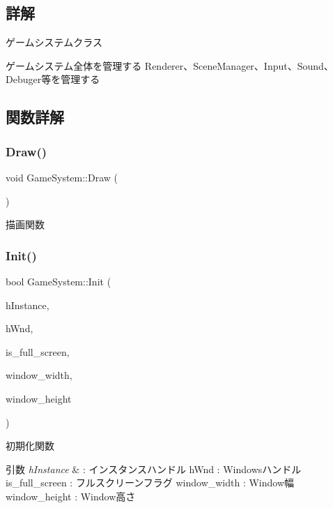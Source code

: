 \subsection{詳解}
ゲームシステムクラス 

ゲームシステム全体を管理する Renderer、\+Scene\+Manager、\+Input、\+Sound、\+Debuger等を管理する 

\subsection{関数詳解}
\mbox{\label{class_game_system_a474db0066b23d39e94e0a830140edce5}} 
\subsubsection{\texorpdfstring{Draw()}{Draw()}}
{\footnotesize\ttfamily void Game\+System\+::\+Draw (\begin{DoxyParamCaption}{ }\end{DoxyParamCaption})}



描画関数 

\mbox{\label{class_game_system_ad4c08500b98490e00ce87a770bb5e981}} 
\subsubsection{\texorpdfstring{Init()}{Init()}}
{\footnotesize\ttfamily bool Game\+System\+::\+Init (\begin{DoxyParamCaption}\item[{H\+I\+N\+S\+T\+A\+N\+CE}]{h\+Instance,  }\item[{H\+W\+ND}]{h\+Wnd,  }\item[{B\+O\+OL}]{is\+\_\+full\+\_\+screen,  }\item[{int}]{window\+\_\+width,  }\item[{int}]{window\+\_\+height }\end{DoxyParamCaption})}



初期化関数 


\begin{DoxyParams}{引数}
{\em h\+Instance} & \+: インスタンスハンドル h\+Wnd \+: Windowsハンドル is\+\_\+full\+\_\+screen \+: フルスクリーンフラグ window\+\_\+width \+: Window幅 window\+\_\+height \+: Window高さ \\
\hline
\end{DoxyParams}
\mbox{\label{class_game_system_aa416827abc995e1b8df4a5cf87911baf}} 

